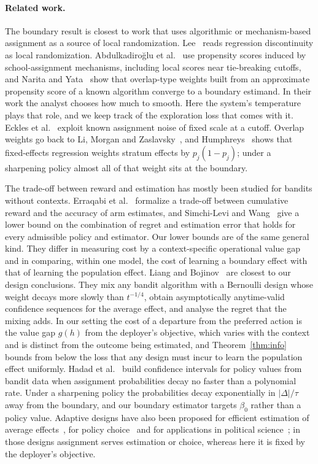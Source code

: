 \documentclass[12pt]{article}
\theoremstyle{definition}
\theoremstyle{remark}
\begin{document}
\paragraph{Related work.}
The boundary result is closest to work that uses algorithmic or mechanism-based
assignment as a source of local randomization. Lee~\cite{lee2008randomized} reads
regression discontinuity as local randomization. Abdulkadiro\u{g}lu et
al.~\cite{abdulkadiroglu2017research,abdulkadiroglu2022breaking} use propensity
scores induced by school-assignment mechanisms, including local scores near
tie-breaking cutoffs, and Narita and Yata~\cite{narita2021algorithm} show that
overlap-type weights built from an approximate propensity score of a known algorithm
converge to a boundary estimand. In their work the analyst chooses how much to
smooth. Here the system's temperature plays that role, and we keep track of the
exploration loss that comes with it. Eckles et al.~\cite{eckles2020noise} exploit
known assignment noise of fixed scale at a cutoff. Overlap weights go back to Li,
Morgan and Zaslavsky~\cite{li2018balancing}, and Humphreys~\cite{humphreys2025bounds}
shows that fixed-effects regression weights stratum effects by $p_j(1-p_j)$; under a
sharpening policy almost all of that weight sits at the boundary.

The trade-off between reward and estimation has mostly been studied for bandits
without contexts. Erraqabi et al.~\cite{erraqabi2017trading} formalize a trade-off
between cumulative reward and the accuracy of arm estimates, and Simchi-Levi and
Wang~\cite{simchilevi2023multi} give a lower bound on the combination of regret and
estimation error that holds for every admissible policy and estimator. Our lower
bounds are of the same general kind. They differ in measuring cost by a
context-specific operational value gap and in comparing, within one model, the cost
of learning a boundary effect with that of learning the population effect. Liang and
Bojinov~\cite{liang2023mixture} are closest to our design conclusions. They mix any
bandit algorithm with a Bernoulli design whose weight decays more slowly than
$t^{-1/4}$, obtain asymptotically anytime-valid confidence sequences for the average
effect, and analyse the regret that the mixing adds. In our setting the cost of a
departure from the preferred action is the value gap $g(h)$ from the deployer's
objective, which varies with the context and is distinct from the outcome being
estimated, and Theorem~\ref{thm:info} bounds from below the loss that any design must
incur to learn the population effect uniformly. Hadad et
al.~\cite{hadad2021confidence} build confidence intervals for policy values from
bandit data when assignment probabilities decay no faster than a polynomial rate.
Under a sharpening policy the probabilities decay exponentially in $|\Delta|/\tau$
away from the boundary, and our boundary estimator targets $\beta_0$ rather than a
policy value. Adaptive designs have also been proposed for efficient estimation of
average effects~\cite{kato2020efficient}, for policy choice~\cite{kasy2021adaptive}
and for applications in political science~\cite{offerwestort2021adaptive}; in those
designs assignment serves estimation or choice, whereas here it is fixed by the
deployer's objective.
\end{document}
